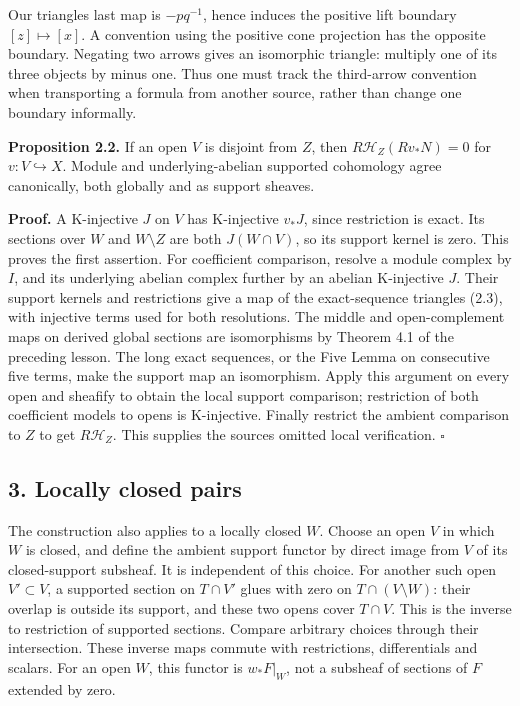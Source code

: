 \documentclass[
  english,
  11pt,
  a4paper,
]{article}
\begin{document}
Our triangle\textquotesingle s last map is \(-p q^{-1}\), hence induces
the positive lift boundary \([z]\mapsto[x]\). A convention using the
positive cone projection has the opposite boundary. Negating two arrows
gives an isomorphic triangle: multiply one of its three objects by minus
one. Thus one must track the third-arrow convention when transporting a
formula from another source, rather than change one boundary informally.

\textbf{Proposition 2.2.} If an open \(V\) is disjoint from \(Z\), then
\(R\mathcal H_Z(Rv_*N)=0\) for \(v:V\hookrightarrow X\). Module and
underlying-abelian supported cohomology agree canonically, both globally
and as support sheaves.

\textbf{Proof.} A K-injective \(J\) on \(V\) has K-injective \(v_*J\),
since restriction is exact. Its sections over \(W\) and \(W\setminus Z\)
are both \(J(W\cap V)\), so its support kernel is zero. This proves the
first assertion. For coefficient comparison, resolve a module complex by
\(I\), and its underlying abelian complex further by an abelian
K-injective \(J\). Their support kernels and restrictions give a map of
the exact-sequence triangles (2.3), with injective terms used for both
resolutions. The middle and open-complement maps on derived global
sections are isomorphisms by Theorem 4.1 of the preceding lesson. The
long exact sequences, or the Five Lemma on consecutive five terms, make
the support map an isomorphism. Apply this argument on every open and
sheafify to obtain the local support comparison; restriction of both
coefficient models to opens is K-injective. Finally restrict the ambient
comparison to \(Z\) to get \(R\mathcal H_Z\). This supplies the
source\textquotesingle s omitted local verification. \(\square\)

\subsection{3. Locally closed
pairs}\label{sections-with-support-and-the-localization-triangle--3-locally-closed-pairs}

The construction also applies to a locally closed \(W\). Choose an open
\(V\) in which \(W\) is closed, and define the ambient support functor
by direct image from \(V\) of its closed-support subsheaf. It is
independent of this choice. For another such open \(V'\subset V\), a
supported section on \(T\cap V'\) glues with zero on
\(T\cap(V\setminus W)\): their overlap is outside its support, and these
two opens cover \(T\cap V\). This is the inverse to restriction of
supported sections. Compare arbitrary choices through their
intersection. These inverse maps commute with restrictions,
differentials and scalars. For an open \(W\), this functor is
\(w_*F|_W\), not a subsheaf of sections of \(F\) extended by zero.
\end{document}
